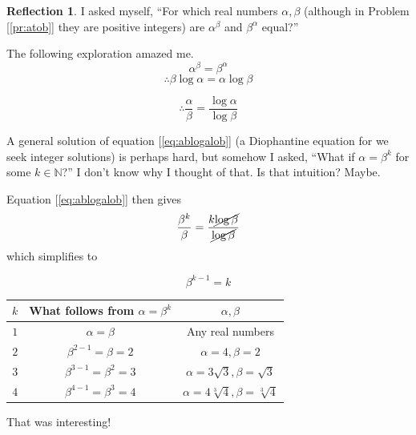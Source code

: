 \documentclass[english,notitlepage,smartquotes]{hgbreport}
\theoremstyle{definition}
\theoremstyle{definition}
\theoremstyle{remark}
\theoremstyle{plain}
\theoremstyle{definition}
\theoremstyle{definition}
\newtheorem{reflection}{Reflection}
\begin{document}
\begin{reflection}

I asked myself, ``For which real numbers $\alpha,\beta$ (although in Problem [\ref{pr:atob}] they are positive integers) are $\alpha^\beta$ and $\beta^\alpha$ equal?''

The following exploration amazed me.
$$
\alpha^\beta=\beta^\alpha
$$
\begin{equation}
\label{eq:takelogs}
\therefore \beta\log\alpha=\alpha\log\beta
\end{equation}

\begin{equation}
\label{eq:ablogalob}
\therefore \frac{\alpha}{\beta}=\frac{\log\alpha}{\log\beta}
\end{equation}

A general solution of equation [\ref{eq:ablogalob}] (a Diophantine equation for we seek integer solutions) is perhaps hard, but somehow I asked, ``What if $\alpha=\beta^k$ for some $k\in\mathbb N$?'' I don't know why I thought of that. Is that intuition? Maybe.

Equation [\ref{eq:ablogalob}] then gives
$$
\frac{\beta^k}{\beta}=\frac{k\cancel{\log\beta}}{\cancel{\log\beta}}
$$
which simplifies to

\begin{equation}
\label{eq:bk-1k}
\beta^{k-1}=k
\end{equation}


\begin{tabular}{|c|c|c|}
 \hline
 $k$ & What follows from $\alpha=\beta^k$ & $\alpha,\beta$ \\ \hline
 \hline
 $1$ & $\alpha=\beta$  & Any real numbers \\ \hline
 $2$ & $\beta^{2-1}=\beta=2$ & $\alpha=4,\beta=2$ \\ \hline
 $3$ & $\beta^{3-1}=\beta^2=3$ & $\alpha=3\sqrt{3},\beta=\sqrt{3}$ \\ \hline
 $4$ & $\beta^{4-1}=\beta^3=4$ & $\alpha=4\sqrt[3]{4},\beta=\sqrt[3]{4}$ \\ \hline
\end{tabular}


That was interesting! 

\end{reflection}
\end{document}
